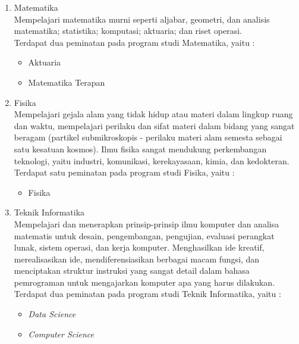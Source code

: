 	\begin{enumerate}
		\item Matematika\\
			Mempelajari matematika murni seperti aljabar, geometri, dan analisis matematika; statistika; komputasi; aktuaria; dan riset operasi.\\

			Terdapat dua peminatan pada program studi Matematika, yaitu :
			
			\begin{itemize}
				\item Aktuaria
				\item Matematika Terapan
			\end{itemize}\leavevmode
			
		\item Fisika\\
			 Mempelajari gejala alam yang tidak hidup atau materi dalam lingkup ruang dan waktu, mempelajari perilaku dan sifat materi dalam bidang yang sangat beragam (partikel submikroskopis - perilaku materi alam semesta sebagai satu kesatuan kosmos). Ilmu fisika sangat mendukung perkembangan teknologi, yaitu industri, komunikasi, kerekayasaan, kimia, dan kedokteran.\\
			 
			 Terdapat satu peminatan pada program studi Fisika, yaitu :
			
			\begin{itemize}
				\item Fisika
			\end{itemize}\leavevmode

		\item Teknik Informatika\\
			Mempelajari dan menerapkan prinsip-prinsip ilmu komputer dan analisa matematis untuk desain, pengembangan, pengujian, evaluasi perangkat lunak, sistem operasi, dan kerja komputer. Menghasilkan ide kreatif, merealisasikan ide, mendiferensiasikan berbagai macam fungsi, dan menciptakan struktur instruksi yang sangat detail dalam bahasa pemrograman untuk mengajarkan komputer apa yang harus dilakukan.\\
			
			Terdapat dua peminatan pada program studi Teknik Informatika, yaitu :
			
			\begin{itemize}
				\item \textit{Data Science}
				\item \textit{Computer Science}
			\end{itemize}\leavevmode
			
	\end{enumerate}\leavevmode
	
